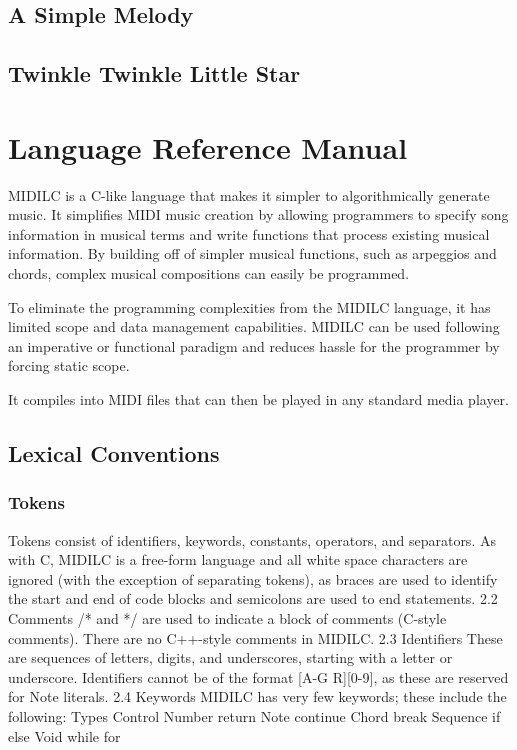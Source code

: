 \documentclass[12pt,A4]{book}
\begin{document}
\section{A Simple Melody}
\section{Twinkle Twinkle Little Star}
\chapter{Language Reference Manual}
MIDILC is a C-like language that makes it simpler to algorithmically generate music.  It simplifies MIDI music creation by allowing programmers to specify song information in musical terms and write functions that process existing musical information.  By building off of simpler musical functions, such as arpeggios and chords, complex musical compositions can easily be programmed.

To eliminate the programming complexities from the MIDILC language, it has limited scope and data management capabilities.  MIDILC can be used following an imperative or functional paradigm and reduces hassle for the programmer by forcing static scope.

It compiles into MIDI files that can then be played in any standard media player.

\section{Lexical Conventions}
\subsection{Tokens}
Tokens consist of identifiers, keywords, constants, operators, and separators.  As with C, MIDILC is a free-form language and all white space characters are ignored (with the exception of separating tokens), as braces are used to identify the start and end of code blocks and semicolons are used to end statements.
2.2 Comments
/* and */ are used to indicate a block of comments (C-style comments).  There are no C++-style comments in MIDILC.
2.3 Identifiers
These are sequences of letters, digits, and underscores, starting with a letter or underscore.  Identifiers cannot be of the format [A-G R][0-9], as these are reserved for Note literals.
2.4 Keywords
MIDILC has very few keywords; these include the following:
Types	Control
Number	return
Note	continue
Chord	break
Sequence	if
	else
Void	while
	for
\end{document}
